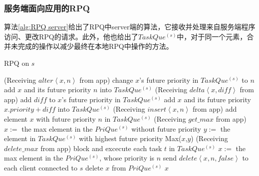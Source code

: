 		\subsubsection{服务端面向应用的RPQ}
			\par 算法\ref{alg:RPQ server}给出了RPQ中server端的算法，它接收并处理来自服务端程序访问、更改RPQ的请求。此外，他也给出了$TaskQue^{(s)}$中，对于同一个元素，合并未完成的操作以减少最终在本地RPQ中操作的方法。
			\begin{algorithm}
				\caption{RPQ on $s$}
				\label{alg:RPQ server}
				\Begin(Receiving $alter\left\langle x,n\right\rangle $ from app)
				{
					{
						change $x$'s future priority in $TaskQue^{(s)}$ to $n$\;
					}
					\Else
					{
						add $x$ and its future priority $n$ into $TaskQue^{(s)}$\;
					}
				}
				\Begin(Receiving $delta\left\langle x,diff\right\rangle $ from app)
				{
					{
						add $diff$ to $x$'s future priority in $TaskQue^{(s)}$\;
					}
					\Else
					{
						add $x$ and its future priority $x.priority+diff$ into $TaskQue^{(s)}$\;
					}
				}
				\Begin(Receiving $insert\left\langle x,n\right\rangle $ from app)
				{
					add element $x$ with future priority $n$ in $TaskQue^{(s)}$\;
				}
				\Begin(Receiving $get\_max$ from app)
				{
					$x:=$ the max element in the $PriQue^{(s)}$ without future priority\;
					$y:=$ the element in $TaskQue^{(s)}$ with highest future priority\;
					\Return Max($x$,$y$)\;
				}
				\Begin(Receiving $delete\_max$ from app)
				{
					block and excecute each task $t$ in $TaskQue^{(s)}$\;
					$x:=$ the max element in the $PriQue^{(s)}$, whose priority is $n$\;
					send $delete\left\langle x,n,\textit{false}\right\rangle $ to each client connected to $s$\;
					delete $x$ from $PriQue^{(s)}$\;
					\Return $x$\;
				}
			\end{algorithm}			
